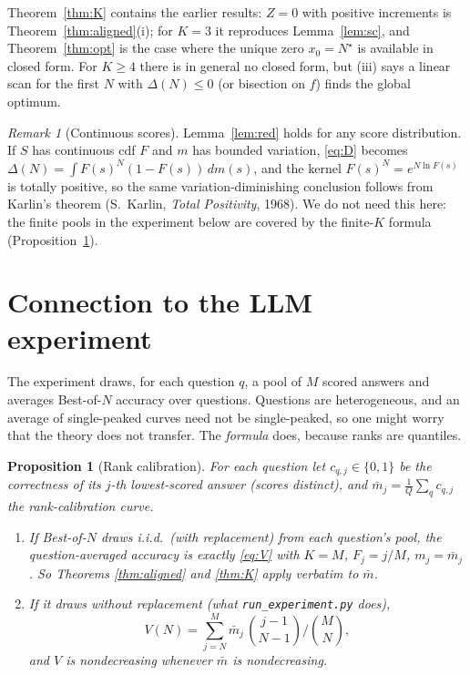 \documentclass[11pt]{article}
\newtheorem{proposition}{Proposition}
\theoremstyle{definition}
\theoremstyle{remark}
\newtheorem{remark}{Remark}
\begin{document}
Theorem~\ref{thm:K} contains the earlier results: $Z=0$ with positive increments is
Theorem~\ref{thm:aligned}(i); for $K=3$ it reproduces Lemma~\ref{lem:sc}, and
Theorem~\ref{thm:opt} is the case where the unique zero $x_0=N^\star$ is available in closed form.
For $K\ge4$ there is in general no closed form, but (iii) says a linear scan for the first
$N$ with $\Delta(N)\le0$ (or bisection on $f$) finds the global optimum.

\begin{remark}[Continuous scores]
Lemma~\ref{lem:red} holds for any score distribution. If $S$ has continuous cdf $F$ and
$m$ has bounded variation, \eqref{eq:D} becomes
$\Delta(N)=\int F(s)^N(1-F(s))\,dm(s)$, and the kernel $F(s)^N=e^{N\ln F(s)}$ is totally
positive, so the same variation-diminishing conclusion follows from Karlin's theorem
(S.~Karlin, \emph{Total Positivity}, 1968). We do not need this here: the finite pools in the
experiment below are covered by the finite-$K$ formula (Proposition~\ref{prop:rank}).
\end{remark}

\section{Connection to the LLM experiment}

The experiment draws, for each question $q$, a pool of $M$ scored answers and averages
Best-of-$N$ accuracy over questions. Questions are heterogeneous, and an average of
single-peaked curves need not be single-peaked, so one might worry that the theory does not
transfer. The \emph{formula} does, because ranks are quantiles.

\begin{proposition}[Rank calibration]\label{prop:rank}
For each question let $c_{q,j}\in\{0,1\}$ be the correctness of its $j$-th lowest-scored answer
(scores distinct), and $\bar m_j=\frac1Q\sum_q c_{q,j}$ the \emph{rank-calibration curve}.
\begin{enumerate}[label=(\roman*)]
\item If Best-of-$N$ draws i.i.d.\ (with replacement) from each question's pool, the
question-averaged accuracy is exactly \eqref{eq:V} with $K=M$, $F_j=j/M$, $m_j=\bar m_j$.
So Theorems \ref{thm:aligned} and \ref{thm:K} apply verbatim to $\bar m$.
\item If it draws without replacement (what \texttt{run\_experiment.py} does),
\[
V(N)=\sum_{j=N}^{M}\bar m_j\,\binom{j-1}{N-1}\Big/\binom{M}{N},
\]
and $V$ is nondecreasing whenever $\bar m$ is nondecreasing.
\end{enumerate}
\end{proposition}
\end{document}
